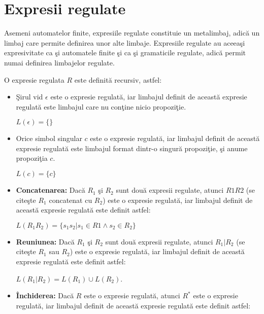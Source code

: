 \section{Expresii regulate}
\label{ch:expresii}

Asemeni automatelor finite, expresiile regulate constituie un metalimbaj, adică un limbaj care permite definirea unor alte limbaje. Expresiile regulate au aceeaşi expresivitate ca şi automatele finite şi ca şi gramaticile regulate, adică permit numai definirea limbajelor regulate.

\begin{definitie}
O expresie regulata $ R $ este definită recursiv, astfel:
\begin{itemize}
\item
Şirul vid $\epsilon$ este o expresie regulată, iar limbajul definit de această expresie regulată este limbajul care nu conţine nicio propoziţie. 

\begin{center}
$L(\epsilon)=\{ \}$
\end{center}

\item 
Orice simbol singular $c$ este o expresie regulată, iar limbajul definit de această expresie regulată este limbajul format dintr-o singură propoziţie, şi anume propoziţia $c$. 

\begin{center}
$L(c)=\{ c \}$
\end{center}

\item 
\textbf{Concatenarea:} Dacă $R_1$ şi $R_2$ sunt două expresii regulate, atunci $R1R2$ (se citeşte $R_1$ concatenat cu $R_2$) este o expresie regulată, iar limbajul definit de această expresie regulată este definit astfel: 

\begin{center}
$L(R_1R_2)=\{s_1s_2| s_1 \in R1 \wedge s_2 \in R_2\}$
\end{center}

\item
\textbf{Reuniunea:} Dacă $R_1$ şi $R_2$ sunt două expresii regulate, atunci $R_1|R_2$ (se citeşte $R_1$ sau $R_2$) este o expresie regulată, iar limbajul definit de această expresie regulată este definit astfel:

\begin{center}
$L(R_1|R_2)=L(R_1) \cup L(R_2)$.
\end{center}

\item
\textbf{Închiderea:} Dacă $ R $ este o expresie regulată, atunci $R^*$ este o expresie regulată, iar limbajul definit de această expresie regulată este definit astfel: 


\end{itemize}
\end{definitie}
